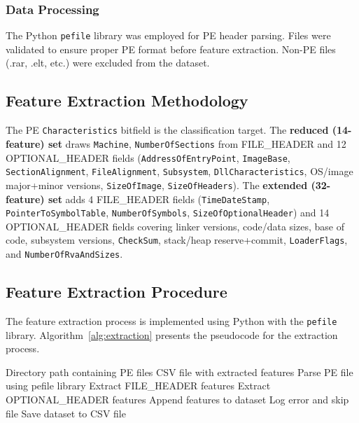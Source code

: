 \documentclass[conference,a4paper]{IEEEtran}
\begin{document}
\subsubsection{Data Processing}
The Python \texttt{pefile} library was employed for PE header parsing. Files were validated to ensure proper PE format before feature extraction. Non-PE files (.rar, .elt, etc.) were excluded from the dataset.

\subsection{Feature Extraction Methodology}

The PE \texttt{Characteristics} bitfield is the classification target. The \textbf{reduced (14-feature) set} draws \texttt{Machine}, \texttt{NumberOfSections} from FILE\_HEADER and 12 OPTIONAL\_HEADER fields (\texttt{AddressOfEntryPoint}, \texttt{ImageBase}, \texttt{SectionAlignment}, \texttt{FileAlignment}, \texttt{Subsystem}, \texttt{DllCharacteristics}, OS/image major+minor versions, \texttt{SizeOfImage}, \texttt{SizeOfHeaders}). The \textbf{extended (32-feature) set} adds 4 FILE\_HEADER fields (\texttt{TimeDateStamp}, \texttt{PointerToSymbolTable}, \texttt{NumberOfSymbols}, \texttt{SizeOfOptionalHeader}) and 14 OPTIONAL\_HEADER fields covering linker versions, code/data sizes, base of code, subsystem versions, \texttt{CheckSum}, stack/heap reserve+commit, \texttt{LoaderFlags}, and \texttt{NumberOfRvaAndSizes}.

\subsection{Feature Extraction Procedure}

The feature extraction process is implemented using Python with the \texttt{pefile} library. Algorithm~\ref{alg:extraction} presents the pseudocode for the extraction process.

\begin{algorithm}[!htbp]
\caption{PE Header Feature Extraction}
\label{alg:extraction}
\begin{algorithmic}[1]
\Require Directory path containing PE files
\Ensure CSV file with extracted features
    \State Parse PE file using pefile library
        \State Extract FILE\_HEADER features
        \State Extract OPTIONAL\_HEADER features
        \State Append features to dataset
    \Else
        \State Log error and skip file
    \EndIf
\EndFor
\State Save dataset to CSV file
\end{algorithmic}
\end{algorithm}
\end{document}
